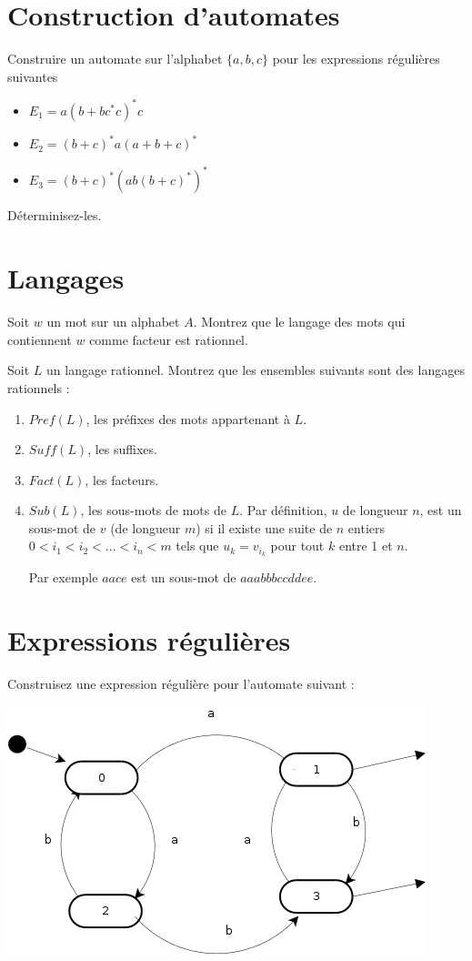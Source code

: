 \documentclass[twoside,11pt]{article}
\begin{document}
\maketitle

\begin{multicols}{2}
\section{Construction d'automates}

\Q Construire un automate sur l'alphabet  $\{ a, b, c \}$
pour les expressions régulières suivantes

\begin{itemize}
\item $E_1 = a {(b + b c^* c)}^* c$
\item $E_2 = {(b+c)}^* a {(a+b+c)}^*$
\item $E_3 = {(b+c)}^* { (ab {(b+c)}^* ) }^*$
\end{itemize}

\Q Déterminisez-les.



\section{Langages}

\Q Soit $w$ un mot sur un alphabet $A$. Montrez que le langage des
mots qui contiennent $w$ comme facteur est rationnel.

\Q Soit $L$ un langage rationnel. Montrez que les ensembles suivants
sont des langages rationnels :
\begin{enumerate}
\item $Pref(L)$, les préfixes des mots appartenant à $L$.
\item $Suff(L)$, les suffixes.
\item $Fact(L)$, les facteurs.
\item $Sub(L)$, les sous-mots de mots de $L$. Par définition, $u$ de
  longueur $n$, est un sous-mot de $v$ (de longueur $m$) si il existe
  une suite de $n$ entiers $0 < i_1 < i_2 < ...< i_n < m$ tels que
  $u_k = v_{i_k}$ pour tout $k$ entre 1 et $n$. 

Par exemple $aace$ est un sous-mot de $aaabbbccddee$.
\end{enumerate}
\section{Expressions régulières}

Construisez une expression régulière pour l'automate suivant :

\end{multicols}


\begin{center}
\includegraphics[width=0.8\linewidth]{../dia/exoauto}
\end{center}
\end{document}
